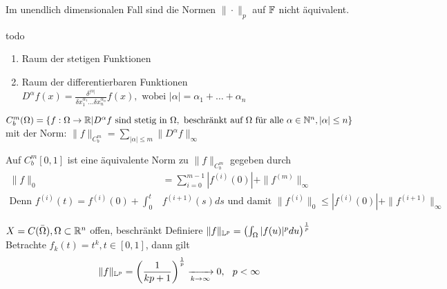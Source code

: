 \begin{bemerkung}
Im unendlich dimensionalen Fall sind die Normen $\| \cdot \|_{p}$ auf $\mathbb{F}$ nicht äquivalent.	
\end{bemerkung}
\begin{beweis}
todo
\end{beweis}


\begin{beispiel}
	\begin{enumerate}[label=\alph*\upshape)]
		\item Raum der stetigen Funktionen
		\item Raum der differentierbaren Funktionen \\
		$D^{\alpha}f(x) = \frac{ \delta^{ | \alpha | } }{ \delta x_{1}^{ \alpha_{1} } \dotsc \delta x_{n}^{ \alpha_{n} } } f(x), \text{ wobei } | \alpha | = \alpha_{1} + \dotsc + \alpha_{n} $ \\ 
	\end{enumerate}
\end{beispiel}

\begin{definition}
$C_{b}^{m}(\Omega) = \{ f: \Omega \rightarrow \mathbb{R} | D^{\alpha}f \text{ sind stetig in } \Omega, \text{ beschränkt auf } \Omega \text{ für alle } \alpha \in \mathbb{N}^{n}, |\alpha| \leq n \}$ \\
mit der Norm: $\| f \|_{C_{b}^{m}} = \sum_{|\alpha| \leq m} \| D^{\alpha}f \|_{\infty}$
\end{definition}

\begin{bemerkung}
Auf $C_{b}^{m} [0, 1]$ ist eine äquivalente Norm zu  $\| f \|_{C_{b}^{m}}$ gegeben durch
\begin{align*}
	\| f \|_{0} & = \sum_{i = 0}^{m - 1} |f^{(i)}(0)| + \| f^{(m)} \|_{\infty} \\
	\text{Denn } f^{(i)}(t) = f^{(i)}(0) + \int_{0}^{t} & f^{(i + 1)}(s) ds \text{ und damit } \| f^{(i)}\|_{0} \leq | f^{(i)}(0) | + \| f^{(i + 1)}\|_{\infty}	
\end{align*}
\end{bemerkung}

\begin{beispiel}
$X = C(\bar\Omega), \Omega \subset \mathbb{R}^{n}$ offen, beschränkt
Definiere $\| f \|_{\mathbb{L}^{p}} = \left( \int_{\Omega} |f(u)|^{p} du \right)^{\frac{1}{p}}$
 Betrachte $f_{k}(t) = t^k, t \in [0, 1]$, dann gilt 
 \[ \| f \|_{\mathbb{L}^{p}} = \left( \frac{1}{kp + 1} \right)^{\frac{1}{p}} \xrightarrow[k \rightarrow \infty]{} 0, \hspace{0.25cm} p < \infty \]
\end{beispiel}

